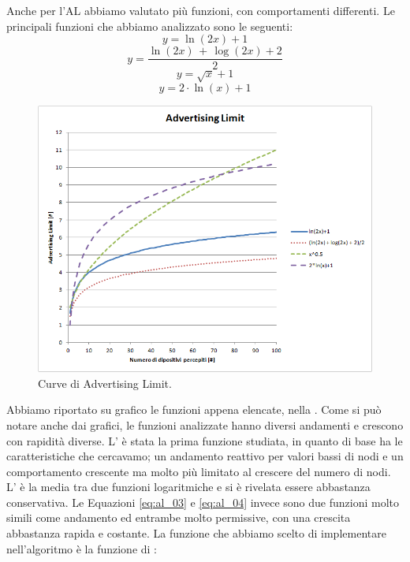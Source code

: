 Anche per l'AL abbiamo valutato più funzioni, con comportamenti differenti. Le principali funzioni che abbiamo analizzato sono le seguenti:
\begin{equation}
	\label{eq:al_01}
	y=\ln \left( 2\textit{x}\right) + 1
\end{equation}
\begin{equation}
	\label{eq:al_02}
	y=\dfrac{\ln \left( 2\textit{x}\right) \, + \, \log\left( 2\textit{x}\right) + 2}{2}
\end{equation}
\begin{equation}
	\label{eq:al_03}
	y=\sqrt{\textit{x}} + 1
\end{equation}
\begin{equation}
	\label{eq:al_04}
	y=2\cdot\ln\left( \textit{x}\right)  + 1
\end{equation}
\begin{figure}[t]
	\centering
	\includegraphics[width=0.9\linewidth]{Images/grafici_usati/AL_curve_no_arr}
	\caption[Curve dell'AL (continuo)]{Curve di Advertising Limit.}
	\label{fig:AL_curve_no_arr}
\end{figure}
Abbiamo riportato su grafico le funzioni appena elencate, nella . Come si può notare anche dai grafici, le funzioni analizzate hanno diversi andamenti e crescono con rapidità diverse. L' è stata la prima funzione studiata, in quanto di base ha le caratteristiche che cercavamo; un andamento reattivo per valori bassi di nodi e un comportamento crescente ma molto più limitato al crescere del numero di nodi. L' è la media tra due funzioni logaritmiche e si è rivelata essere abbastanza conservativa. Le Equazioni \eqref{eq:al_03} e \eqref{eq:al_04} invece sono due funzioni molto simili come andamento ed entrambe molto permissive, con una crescita abbastanza rapida e costante. La funzione che abbiamo scelto di implementare nell'algoritmo è la funzione di :

